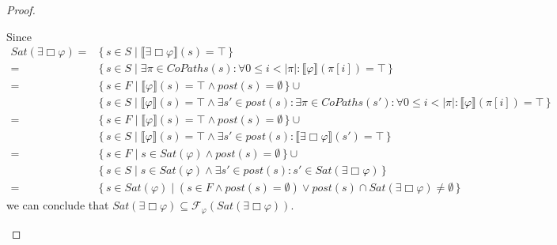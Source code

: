 \documentclass[12pt]{article}
\newcommand{\always}{\Box}
\theoremstyle{definition}
\newcommand{\satisfaction}[1]{\llbracket #1 \rrbracket}
\newenvironment{franck}{\color{red}}{\color{black}}
\begin{document}
\begin{proof}
\begin{itemize}
\begin{franck}
Since
\begin{align*}
\mathit{Sat}(\exists \always \varphi)
= & \{\, s \in S \mid \satisfaction{\exists \always \varphi}(s) = \top \,\}\\
= & \{\, s \in S \mid \exists \pi \in \mathit{CoPaths}(s) : \forall 0 \leq i < |\pi| : \satisfaction{\varphi}(\pi[i]) = \top \,\}\\
= & \{\, s \in F \mid \satisfaction{\varphi}(s) = \top \wedge \mathit{post}(s) = \emptyset \,\} \cup\\
& \{\, s \in S \mid \satisfaction{\varphi}(s) = \top \wedge \exists s' \in \mathit{post}(s) : \exists \pi \in \mathit{CoPaths}(s') : \forall 0 \leq i < |\pi| : \satisfaction{\varphi}(\pi[i]) = \top \,\}\\
= & \{\, s \in F \mid \satisfaction{\varphi}(s) = \top \wedge \mathit{post}(s) = \emptyset \,\} \cup\\
& \{\, s \in S \mid \satisfaction{\varphi}(s) = \top \wedge \exists s' \in \mathit{post}(s) : \satisfaction{\exists \always \varphi}(s') = \top \,\}\\
= & \{\, s \in F \mid s \in \mathit{Sat}(\varphi) \wedge \mathit{post}(s) = \emptyset \,\} \cup\\
& \{\, s \in S \mid s \in \mathit{Sat}(\varphi) \wedge \exists s' \in \mathit{post}(s) : s' \in \mathit{Sat}(\exists \always \varphi) \,\}\\
= & \{\, s \in \mathit{Sat}(\varphi) \mid (s \in F \wedge \mathit{post}(s) = \emptyset) \vee \mathit{post}(s) \cap \mathit{Sat}(\exists \always \varphi) \not= \emptyset \,\}
\end{align*}
we can conclude that $\mathit{Sat}(\exists \always \varphi) \subseteq \mathcal{F}_{\varphi}(\mathit{Sat}(\exists \always \varphi))$.


\end{franck}
\end{itemize}
\end{proof}
\end{document}
